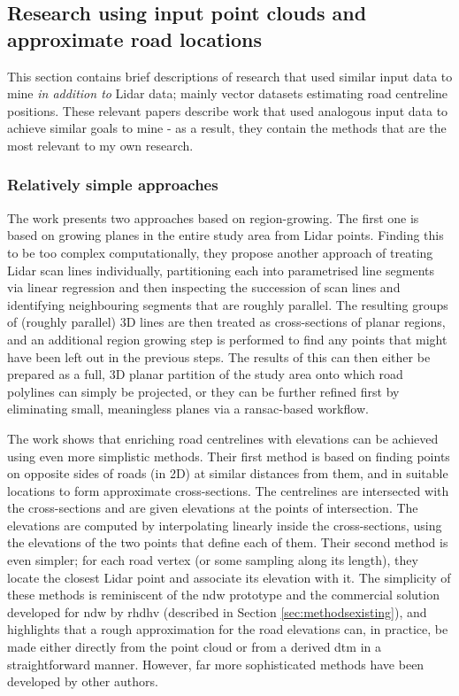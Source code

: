 \subsection{Research using input point clouds and approximate road locations}
\label{sub:lidaraccuracy_external}

This section contains brief descriptions of research that used similar input data to mine \textit{in addition to} Lidar data; mainly vector datasets estimating road centreline positions. These relevant papers describe work that used analogous input data to achieve similar goals to mine - as a result, they contain the methods that are the most relevant to my own research.

\subsubsection{Relatively simple approaches}

The work \cite{hatger_brenner_2003} presents two approaches based on region-growing. The first one is based on growing planes in the entire study area from Lidar points. Finding this to be too complex computationally, they propose another approach of treating Lidar scan lines individually, partitioning each into parametrised line segments via linear regression and then inspecting the succession of scan lines and identifying neighbouring segments that are roughly parallel. The resulting groups of (roughly parallel) 3D lines are then treated as cross-sections of planar regions, and an additional region growing step is performed to find any points that might have been left out in the previous steps. The results of this can then either be prepared as a full, 3D planar partition of the study area onto which road polylines can simply be projected, or they can be further refined first by eliminating small, meaningless planes via a \ac{ransac}-based workflow.

The work \cite{cai_rasdorf_2008} shows that enriching road centrelines with elevations can be achieved using even more simplistic methods. Their first method is based on finding points on opposite sides of roads (in 2D) at similar distances from them, and in suitable locations to form approximate cross-sections. The centrelines are intersected with the cross-sections and are given elevations at the points of intersection. The elevations are computed by interpolating linearly inside the cross-sections, using the elevations of the two points that define each of them. Their second method is even simpler; for each road vertex  (or some sampling along its length), they locate the closest Lidar point and associate its elevation with it. The simplicity of these methods is reminiscent of the \ac{ndw} prototype and the commercial solution developed for \ac{ndw} by \ac{rhdhv} (described in Section \ref{sec:methodsexisting}), and highlights that a rough approximation for the road elevations can, in practice, be made either directly from the point cloud or from a derived \ac{dtm} in a straightforward manner. However, far more sophisticated methods have been developed by other authors.

